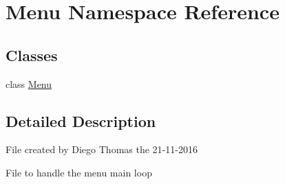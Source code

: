 \hypertarget{namespace_menu}{}\section{Menu Namespace Reference}
\label{namespace_menu}
\subsection*{Classes}
\begin{DoxyCompactItemize}
\item 
class \hyperlink{class_menu_1_1_menu}{Menu}
\end{DoxyCompactItemize}


\subsection{Detailed Description}
\begin{DoxyVerb}File created by Diego Thomas the 21-11-2016

File to handle the menu main loop
\end{DoxyVerb}
 